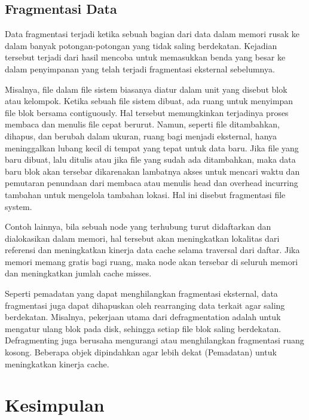 \subsection{Fragmentasi Data}

Data fragmentasi terjadi ketika sebuah bagian dari data dalam memori rusak ke dalam banyak potongan-potongan yang tidak saling berdekatan. Kejadian tersebut terjadi dari hasil mencoba untuk memasukkan benda yang besar ke dalam penyimpanan yang telah terjadi fragmentasi eksternal sebelumnya.

Misalnya, file dalam file sistem biasanya diatur dalam unit yang disebut blok atau kelompok. Ketika sebuah file sistem dibuat, ada ruang untuk menyimpan file blok bersama contiguously. Hal tersebut memungkinkan terjadinya proses membaca dan menulis file cepat berurut. Namun, seperti file ditambahkan, dihapus, dan berubah dalam ukuran, ruang bagi menjadi eksternal, hanya meninggalkan lubang kecil di tempat yang tepat untuk data baru. Jika file yang baru dibuat, lalu ditulis atau jika file yang sudah ada ditambahkan, maka data baru blok akan tersebar dikarenakan lambatnya akses untuk mencari waktu dan pemutaran penundaan dari membaca atau menulis head dan overhead incurring tambahan untuk mengelola tambahan lokasi. Hal ini disebut fragmentasi file system.

Contoh lainnya, bila sebuah node yang terhubung turut didaftarkan dan dialokasikan dalam memori, hal tersebut akan meningkatkan lokalitas dari referensi dan meningkatkan kinerja data cache selama traversal dari daftar. Jika memori memang gratis bagi ruang, maka node akan tersebar di seluruh memori dan meningkatkan jumlah cache misses.

Seperti pemadatan yang dapat menghilangkan fragmentasi eksternal, data fragmentasi juga dapat dihapuskan oleh rearranging data terkait agar saling berdekatan. Misalnya, pekerjaan utama dari defragmentation adalah untuk mengatur ulang blok pada disk, sehingga setiap file blok saling berdekatan. Defragmenting juga berusaha mengurangi atau menghilangkan fragmentasi ruang kosong. Beberapa objek dipindahkan agar lebih dekat (Pemadatan) untuk meningkatkan kinerja cache.

\section{Kesimpulan}

